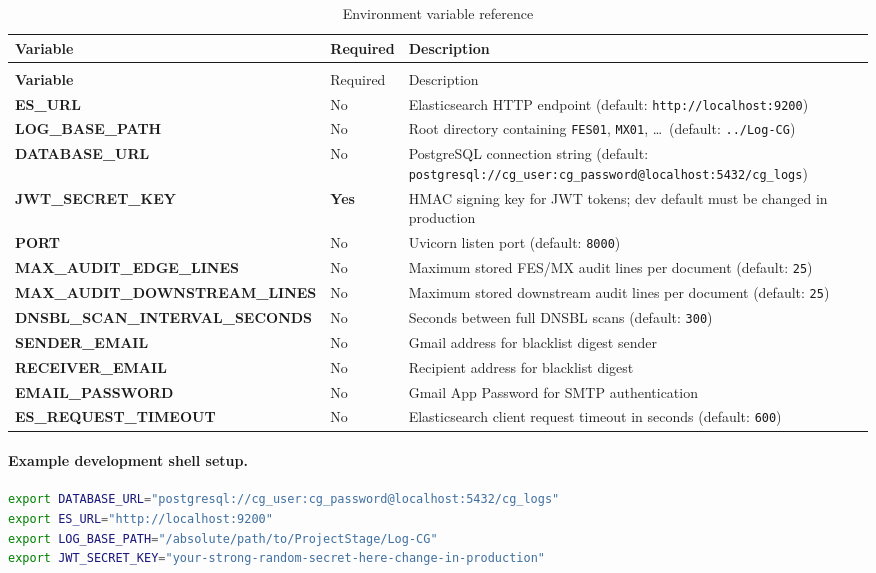 \documentclass[12pt,a4paper,oneside]{report}
\newcommand{\rowA}{\rowcolor{rowgray}}
\begin{document}
\begin{longtable}{@{}>{\bfseries\ttfamily}p{5cm} p{1.8cm} >{\raggedright\arraybackslash}p{\dimexpr\linewidth-7.8cm\relax}@{}}
\caption{Environment variable reference} \label{tab:envvars} \\
\toprule
\textnormal{Variable} & Required & Description \\
\midrule
\endfirsthead
\multicolumn{3}{@{}l}{\small\itshape (Table~\ref{tab:envvars} continued)} \\
\toprule
\textnormal{Variable} & Required & Description \\
\midrule
\endhead
\bottomrule
\endlastfoot
ES\_URL & No & Elasticsearch HTTP endpoint (default: \texttt{http://localhost:9200}) \\
\rowA LOG\_BASE\_PATH & No & Root directory containing \texttt{FES01}, \texttt{MX01}, \ldots\ (default: \texttt{../Log-CG}) \\
DATABASE\_URL & No & PostgreSQL connection string (default: \texttt{postgresql://cg\_user:cg\_password@localhost:5432/cg\_logs}) \\
\rowA JWT\_SECRET\_KEY & \textbf{Yes} & HMAC signing key for JWT tokens; dev default must be changed in production \\
PORT & No & Uvicorn listen port (default: \texttt{8000}) \\
\rowA MAX\_AUDIT\_EDGE\_LINES & No & Maximum stored FES/MX audit lines per document (default: \texttt{25}) \\
MAX\_AUDIT\_DOWNSTREAM\_LINES & No & Maximum stored downstream audit lines per document (default: \texttt{25}) \\
\rowA DNSBL\_SCAN\_INTERVAL\_SECONDS & No & Seconds between full DNSBL scans (default: \texttt{300}) \\
SENDER\_EMAIL & No & Gmail address for blacklist digest sender \\
\rowA RECEIVER\_EMAIL & No & Recipient address for blacklist digest \\
EMAIL\_PASSWORD & No & Gmail App Password for SMTP authentication \\
\rowA ES\_REQUEST\_TIMEOUT & No & Elasticsearch client request timeout in seconds (default: \texttt{600}) \\
\end{longtable}

\paragraph{Example development shell setup.}
\begin{lstlisting}[style=reportcode,language=bash,caption={Development environment setup},label={lst:envsetup}]
export DATABASE_URL="postgresql://cg_user:cg_password@localhost:5432/cg_logs"
export ES_URL="http://localhost:9200"
export LOG_BASE_PATH="/absolute/path/to/ProjectStage/Log-CG"
export JWT_SECRET_KEY="your-strong-random-secret-here-change-in-production"
\end{lstlisting}
\end{document}
